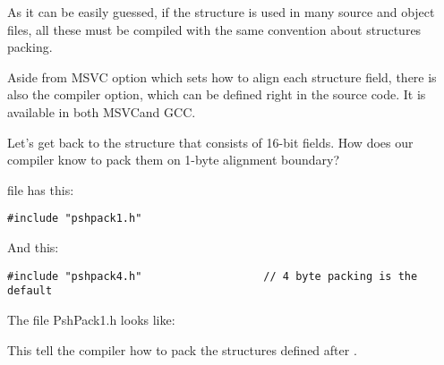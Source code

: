 As it can be easily guessed, if the structure is used in many source and object files,
all these must be compiled with the same convention about structures packing.



Aside from MSVC  option which sets how to align each structure field, there is also
the  compiler option, which can be defined right in the source code.
It is available in both MSVC\FNURLMSDNZP and GCC\FNURLGCCPC{}.

Let's get back to the  structure that consists of 16-bit fields.
How does our compiler know to pack them on 1-byte alignment boundary?

 file has this:

\begin{lstlisting}[caption=WinNT.h,style=customc]
#include "pshpack1.h"
\end{lstlisting}

And this:

\begin{lstlisting}[caption=WinNT.h,style=customc]
#include "pshpack4.h"                   // 4 byte packing is the default
\end{lstlisting}

The file PshPack1.h looks like:



This tell the compiler how to pack the structures defined after .



